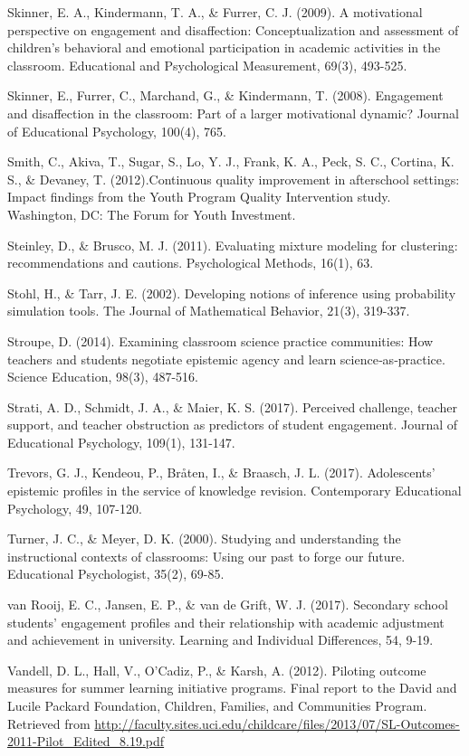 \documentclass[]{book}
\theoremstyle{definition}
\theoremstyle{definition}
\theoremstyle{definition}
\theoremstyle{remark}
\begin{document}
Skinner, E. A., Kindermann, T. A., \& Furrer, C. J. (2009). A
motivational perspective on engagement and disaffection:
Conceptualization and assessment of children's behavioral and emotional
participation in academic activities in the classroom. Educational and
Psychological Measurement, 69(3), 493-525.

Skinner, E., Furrer, C., Marchand, G., \& Kindermann, T. (2008).
Engagement and disaffection in the classroom: Part of a larger
motivational dynamic? Journal of Educational Psychology, 100(4), 765.

Smith, C., Akiva, T., Sugar, S., Lo, Y. J., Frank, K. A., Peck, S. C.,
Cortina, K. S., \& Devaney, T. (2012).Continuous quality improvement in
afterschool settings: Impact findings from the Youth Program Quality
Intervention study. Washington, DC: The Forum for Youth Investment.

Steinley, D., \& Brusco, M. J. (2011). Evaluating mixture modeling for
clustering: recommendations and cautions. Psychological Methods, 16(1),
63.

Stohl, H., \& Tarr, J. E. (2002). Developing notions of inference using
probability simulation tools. The Journal of Mathematical Behavior,
21(3), 319-337.

Stroupe, D. (2014). Examining classroom science practice communities:
How teachers and students negotiate epistemic agency and learn
science‐as‐practice. Science Education, 98(3), 487-516.

Strati, A. D., Schmidt, J. A., \& Maier, K. S. (2017). Perceived
challenge, teacher support, and teacher obstruction as predictors of
student engagement. Journal of Educational Psychology, 109(1), 131-147.

Trevors, G. J., Kendeou, P., Bråten, I., \& Braasch, J. L. (2017).
Adolescents' epistemic profiles in the service of knowledge revision.
Contemporary Educational Psychology, 49, 107-120.

Turner, J. C., \& Meyer, D. K. (2000). Studying and understanding the
instructional contexts of classrooms: Using our past to forge our
future. Educational Psychologist, 35(2), 69-85.

van Rooij, E. C., Jansen, E. P., \& van de Grift, W. J. (2017).
Secondary school students' engagement profiles and their relationship
with academic adjustment and achievement in university. Learning and
Individual Differences, 54, 9-19.

Vandell, D. L., Hall, V., O'Cadiz, P., \& Karsh, A. (2012). Piloting
outcome measures for summer learning initiative programs. Final report
to the David and Lucile Packard Foundation, Children, Families, and
Communities Program. Retrieved from
\url{http://faculty.sites.uci.edu/childcare/files/2013/07/SL-Outcomes-2011-Pilot_Edited_8.19.pdf}
\end{document}
